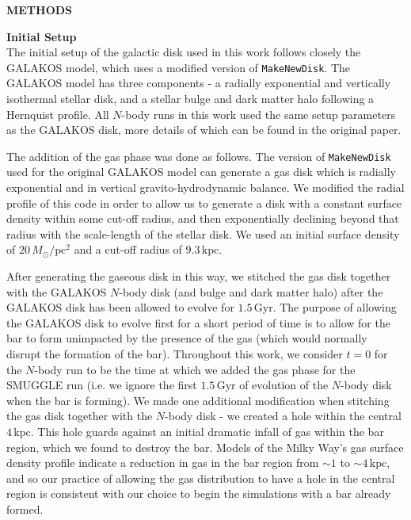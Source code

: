 \documentclass{natureprintstyle}
\newcommand{\Nbody}{$N$-body}
\begin{document}

\FloatBarrier
\clearpage

\setcounter{page}{1}
\setcounter{figure}{0}
\setcounter{table}{0}
\renewcommand{\figurename}{Extended Data Figure}
\renewcommand{\thetable}{Extended Data \arabic{table}}

\noindent
{\bf \Large \uppercase{Methods} }

\bigskip

\noindent
{\bf Initial Setup}
\\
\noindent
The initial setup of the galactic disk used in this work follows closely the
GALAKOS model\cite{2020ApJ...890..117D}, which uses a modified version of
\texttt{MakeNewDisk}.\cite{2005MNRAS.361..776S} The GALAKOS model has three
components - a radially exponential and vertically isothermal stellar disk,
and a stellar bulge and dark matter halo following a Hernquist
profile.\cite{1990ApJ...356..359H} All \Nbody{} runs in this work used the same
setup parameters as the GALAKOS disk, more details of which can be found in
the original paper.

The addition of the gas phase was done as follows. The version of
\texttt{MakeNewDisk} used for the original GALAKOS model can generate a gas
disk which is radially exponential and in vertical gravito-hydrodynamic
balance. We modified the radial profile of this code in order to allow us to
generate a disk with a constant surface density within some cut-off radius,
and then exponentially declining beyond that radius with the scale-length of
the stellar disk. We used an initial surface density of
$20\,M_{\odot}/\textrm{pc}^2$ and a cut-off radius of $9.3\,\textrm{kpc}$.

After generating the gaseous disk in this way, we stitched the gas disk
together with the GALAKOS \Nbody{} disk (and bulge and dark matter halo) after
the GALAKOS disk has been allowed to evolve for $1.5\,\textrm{Gyr}$. The
purpose of allowing the GALAKOS disk to evolve first for a short period of
time is to allow for the bar to form unimpacted by the presence of the gas
(which would normally disrupt the formation of the bar). Throughout this work,
we consider $t=0$ for the \Nbody{} run to be the time at which we added the
gas phase for the SMUGGLE run (i.e. we ignore the first $1.5\,\textrm{Gyr}$ of
evolution of the \Nbody{} disk when the bar is forming). We made one
additional modification when stitching the gas disk together with the \Nbody{}
disk - we created a hole within the central $4\,\textrm{kpc}$. This hole
guards against an initial dramatic infall of gas within the bar region, which
we found to destroy the bar. Models of the Milky Way's gas surface density
profile indicate a reduction in gas in the bar region from $\sim1$ to
$\sim4\,\textrm{kpc}$,\cite{2022ApJ...929L..18E} and so our practice of
allowing the gas distribution to have a hole in the central region is
consistent with our choice to begin the simulations with a bar already formed.
\end{document}
